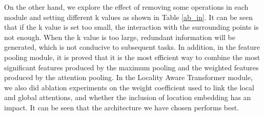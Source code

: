 \documentclass[conference]{IEEEtran}
\begin{document}
\vspace{-3mm}
\begin{table}[h]
\caption{Ablation experiments for different modules.}
\centering
\vspace{-2mm}

\label{ab_module}
\vspace{-2mm}
\end{table}


On the other hand, we explore the effect of removing some operations in each module and setting different k values as shown in Table \ref{ab_in}. It can be seen that if the k value is set too small, the interaction with the surrounding points is not enough. When the k value is too large, redundant information will be generated, which is not conducive to subsequent tasks. In addition, in the feature pooling module, it is proved that it is the most efficient way to combine the most significant features produced by the maximum pooling and the weighted features produced by the attention pooling. In the Locality Aware Transformer module, we also did ablation experiments on the weight coefficient  used to link the local and global attentions, and whether the inclusion of location embedding has an impact. It can be seen that the architecture we have chosen  performs best.
\end{document}
